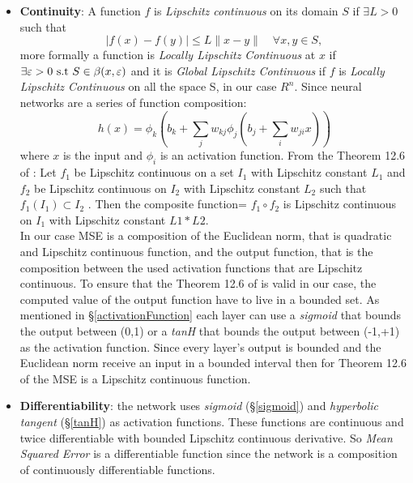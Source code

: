 \begin{itemize}
	\item \textbf{Continuity}: A function $f$ is \textit{Lipschitz continuous} on its domain $S$ if $\exists L>0$ such that
	\begin{equation}
	|f(x)-f(y)| \leq L\parallel x-y\parallel \quad \forall x,y \in S,  
	\end{equation} 
	more formally a function is \textit{Locally Lipschitz Continuous} at $x$ if $\exists \varepsilon >0 \textnormal{ s.t } S \in \beta(x,\varepsilon) $
	and it is \textit{Global Lipschitz Continuous} if $f$ is \textit{Locally Lipschitz Continuous} on all the space S, in our case $R^n$.
	Since neural networks are a series of function composition: 
	\begin{equation}
	h(x) = \phi_{k}(b_{k} + \sum_{j}w_{kj} \phi_{j}(b_{j} + \sum_{i}w_{ji}x))
	\end{equation}
	where $x$ is the input and $\phi_{i}$ is an activation function. 
	From the Theorem 12.6 of \cite{MFD}: Let $f_{1}$ be Lipschitz continuous on a set $I_{1}$ with Lipschitz constant $L_{1}$ and $f_{2}$ be Lipschitz continuous on $I_{2}$ with Lipschitz constant $L_{2}$ such that $f_{1}(I_{1}) \subset I_{2}$ . Then the composite function= $f_{1}\circ f_{2}$ is Lipschitz continuous on $I_{1}$ with Lipschitz constant $L1*L2$. 
	\\
	In our case MSE is a composition of the Euclidean norm, that is quadratic and Lipschitz continuous function, and the output function, that is the composition between the used activation functions that are Lipschitz continuous. To ensure that the Theorem 12.6 of \cite{MFD} is valid in our case, the computed value of the output function have to live in a bounded set. As mentioned in \S \ref{activationFunction} each layer can use a \textit{sigmoid} that bounds the output between (0,1) or a \textit{tanH} that bounds the output  between (-1,+1) as the activation function. Since every layer's output is bounded and the Euclidean norm receive an input in a bounded interval then for Theorem 12.6 of \cite{MFD} the MSE is a Lipschitz continuous function.	
	\item  \textbf{Differentiability}:  the network uses \textit{sigmoid} (\S \ref{sigmoid}) and \textit{hyperbolic tangent} (\S \ref{tanH}) as activation functions. These functions are continuous and twice differentiable with bounded Lipschitz continuous derivative. So \textit{Mean Squared Error} is a differentiable function since the network is a composition of continuously differentiable functions. 

\end{itemize}
